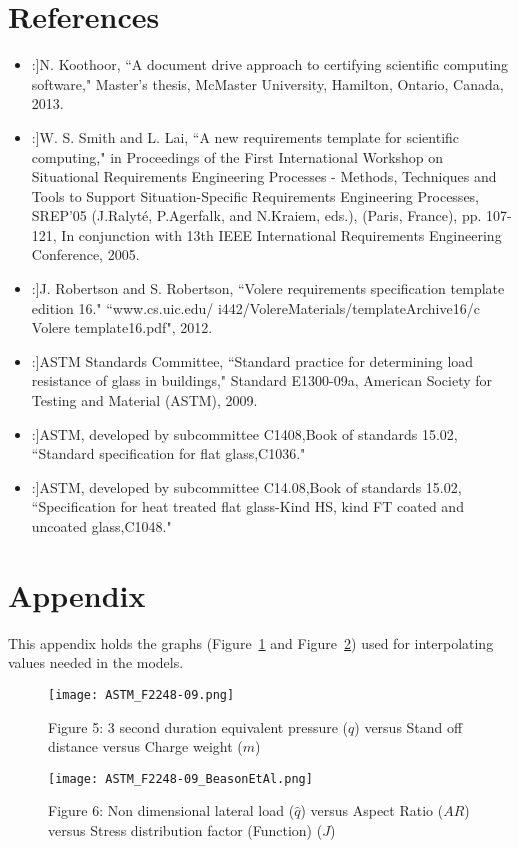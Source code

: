 \documentclass[12pt]{article}
\begin{document}
\section{References}
\label{Sec:R}
\begin{itemize}
\item[[1]:]N. Koothoor, ``A document drive approach to certifying scientific computing software," Master's thesis, McMaster University, Hamilton, Ontario, Canada, 2013.
\item[[2]:]W. S. Smith and L. Lai, ``A new requirements template for scientific computing," in Proceedings of the First International Workshop on Situational Requirements Engineering Processes - Methods, Techniques and Tools to Support Situation-Specific Requirements Engineering Processes, SREP'05 (J.Ralyt\'{e}, P.Agerfalk, and N.Kraiem, eds.), (Paris, France), pp. 107-121, In conjunction with 13th IEEE International Requirements Engineering Conference, 2005.
\item[[3]:]J. Robertson and S. Robertson, ``Volere requirements specification template edition 16." ``www.cs.uic.edu/ i442/VolereMaterials/templateArchive16/c Volere template16.pdf", 2012.
\item[[4]:]ASTM Standards Committee, ``Standard practice for determining load resistance of glass in buildings," Standard E1300-09a, American Society for Testing and Material (ASTM), 2009.
\item[[5]:]ASTM, developed by subcommittee C1408,Book of standards 15.02, ``Standard specification for flat glass,C1036."
\item[[6]:]ASTM, developed by subcommittee C14.08,Book of standards 15.02, ``Specification for heat treated flat glass-Kind HS, kind FT coated and uncoated glass,C1048."
\end{itemize}
\section{Appendix}
\label{Sec:A}
This appendix holds the graphs (Figure~\ref{Figure:F53sdep()vSodvCw()} and Figure~\ref{Figure:F6Ndll()vAR()vSdf(()}) used for interpolating values needed in the models.
\begin{figure}
\begin{center}
\texttt{[image: ASTM\_F2248-09.png]}
\caption{Figure 5: 3 second duration equivalent pressure ($q$) versus Stand off distance versus Charge weight ($m$)}
\label{Figure:F53sdep()vSodvCw()}
\end{center}
\end{figure}
\begin{figure}
\begin{center}
\texttt{[image: ASTM\_F2248-09\_BeasonEtAl.png]}
\caption{Figure 6: Non dimensional lateral load ($\hat{q}$) versus Aspect Ratio ($AR$) versus Stress distribution factor (Function) ($J$)}
\label{Figure:F6Ndll()vAR()vSdf(()}
\end{center}
\end{figure}
\end{document}
